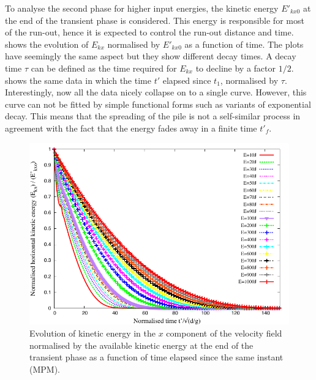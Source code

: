 \documentclass[3p,times,procedia,number]{elsarticle}
\begin{document}
To analyse the second phase for higher input energies, the 
kinetic energy $E'_{kx0}$ at the end of the transient phase is 
considered. This energy is responsible for most of the run-out, hence it is 
expected to 
control the run-out distance and time.~ 
shows the evolution of $E_{kx}$ normalised by $E'_{kx0}$ as a function of time. 
The plots have seemingly the same aspect but they show different decay times. A 
decay time $\tau$ can be defined as the time required for $E_{kx}$ to decline 
by a factor $1/2$.~ shows the same data in 
which the time $t'$ elapsed since $t_1$, normalised by $\tau$. Interestingly, 
now all the data nicely collapse on to a single curve. However, this curve can 
not be fitted by simple functional forms such as variants of exponential decay. 
This means that the spreading of the pile is not a self-similar process in 
agreement with the fact that the energy fades away in a finite time $t'_f$. 

\clearpage

\begin{figure}[tbhp]
  \centering
  \includegraphics[width=\textwidth]{figs/Normalised_KExExop_Slope}
  \caption[Evolution of the normalised horizontal kinetic energy as function of 
  time since the transient phase.]{Evolution of kinetic energy in the $x$ 
  component of the velocity field normalised by the available kinetic energy at 
  the
  end of the transient phase as a function of time elapsed since the
  same instant (MPM).}
  \label{fig:Normalised_KExExop_Slope}
\end{figure}
\end{document}
